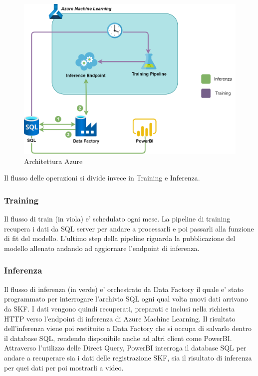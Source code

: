 \begin{figure}[t]
	
\centering
\includegraphics[width=14cm, scale=1]{images/deploy_scheme}
  \caption{Architettura Azure}
	\label{azure}

\end{figure}


Il flusso delle operazioni si divide invece in Training e Inferenza.

\subsubsection{Training}
Il flusso di train (in viola) e' schedulato ogni mese. La pipeline di training recupera i dati da SQL server per andare a processarli e poi passarli alla funzione di fit del modello. L'ultimo step della pipeline riguarda la pubblicazione del modello allenato andando ad aggiornare l'endpoint di inferenza.

\subsubsection{Inferenza}
Il flusso di inferenza (in verde) e' orchestrato da Data Factory il quale e' stato programmato per interrogare l'archivio SQL ogni qual volta nuovi dati arrivano da SKF. I dati vengono quindi recuperati, preparati e inclusi nella richiesta HTTP verso l'endpoint di inferenza di Azure Machine Learning. Il risultato dell'inferenza viene poi restituito a Data Factory che si occupa di salvarlo dentro il database SQL, rendendo disponibile anche ad altri client come PowerBI. Attraverso l'utilizzo delle Direct Query, PowerBI interroga il database SQL per andare a recuperare sia i dati delle registrazione SKF, sia il risultato di inferenza per quei dati per poi mostrarli a video.


